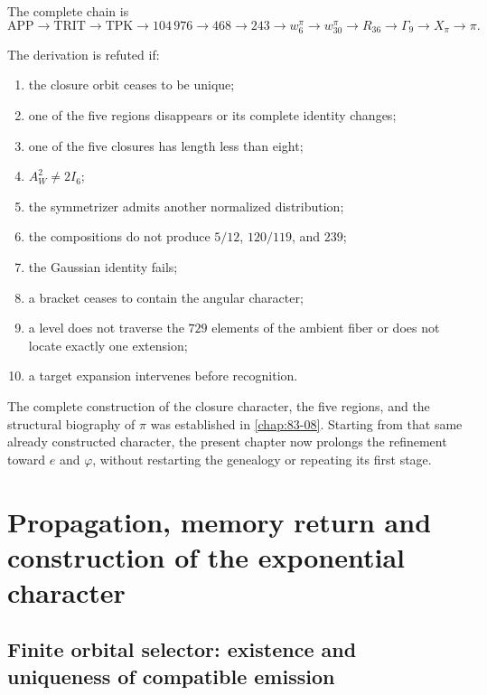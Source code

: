 The complete chain is
\[
 \mathrm{APP}\to\mathrm{TRIT}\to\mathrm{TPK}
 \to104\,976\to468\to243\to w_6^\pi
 \to w_{30}^\pi\to R_{36}\to\Gamma_9
 \to X_\pi\to\pi.
\]

\begin{criterion}
The derivation is refuted if:
\begin{enumerate}
 \item the closure orbit ceases to be unique;
 \item one of the five regions disappears or its complete identity changes;
 \item one of the five closures has length less than eight;
 \item \(A_W^2\ne2I_6\);
 \item the symmetrizer admits another normalized distribution;
 \item the compositions do not produce \(5/12\), \(120/119\), and \(239\);
 \item the Gaussian identity fails;
 \item a bracket ceases to contain the angular character;
 \item a level does not traverse the \(729\) elements of the ambient fiber or does not
       locate exactly one extension;
 \item a target expansion intervenes before recognition.
\end{enumerate}
\end{criterion}
\fi

The complete construction of the closure character, the five regions, and the
structural biography of \(\pi\) was established in
\cref{chap:83-08}. Starting from that same already constructed character, the present
chapter now prolongs the refinement toward \(e\) and \(\varphi\), without
restarting the genealogy or repeating its first stage.



\section{Propagation, memory return and construction of the exponential character}
\label{p12-83-c9-s2:chap:biografia-completa-e}

\subsection{Finite orbital selector: existence and uniqueness of compatible emission}


